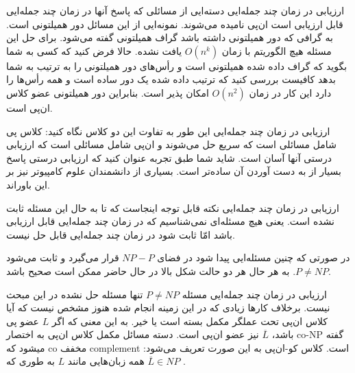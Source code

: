 \begin{itemframe}{ارزیابی در زمان چند جمله‌ایی}
\itm
دسته‌ایی از مسائلی که پاسخ آنها در زمان چند جمله‌ایی قابل ارزیابی است ان‌پی نامیده می‌شوند. نمونه‌ایی از این مسائل دور همیلتونی است. به گرافی که دور همیلتونی داشته باشد گراف همیلتونی
 گفته می‌شود.
\itm
برای حل این مسئله هیچ الگوریتم با زمان
$O(n^k)$
یافت نشده.
\itm
حالا فرض کنید که کسی به شما بگوید که گراف داده شده همیلتونی است و رأس‌های دور همیلتونی را به ترتیب به شما بدهد کافیست بررسی کنید که ترتیب داده شده یک دور ساده است و همه رأس‌ها را دارد این کار در زمان
$O(n^2)$
امکان پذیر است. بنابراین دور همیلتونی عضو کلاس ان‌پی است.
\end{itemframe}
\begin{itemframe}{ارزیابی در زمان چند جمله‌ایی}
\itm
این طور به تفاوت این دو کلاس نگاه کنید:‌ کلاس پی شامل مسائلی است که سریع حل می‌شوند و ان‌پی شامل مسائلی است که ارزیابی درستی آنها آسان است.
\itm
شاید شما طبق تجربه عنوان کنید که ارزیابی درستی پاسخ بسیار از به دست آوردن آن ساده‌تر است. بسیاری از دانشمندان علوم کامپیوتر نیز بر این باوراند.
\end{itemframe}
\begin{itemframe}{ارزیابی در زمان چند جمله‌ایی}
\itm
نکته قابل توجه اینجاست که تا به حال این مسئله ثابت نشده است. یعنی هیچ مسئله‌ای نمی‌شناسیم که در زمان چند جمله‌ایی قابل ارزیابی باشد امّا ثابت شود در زمان چند جمله‌ایی قابل حل نیست.

\itm
در صورتی که چنین مسئله‌ایی پیدا شود در فضای
$NP - P$
قرار می‌گیرد و ثابت می‌شود
$P \neq NP$.
به هر حال هر دو حالت شکل بالا در حال حاضر ممکن است صحیح باشد.
\end{itemframe}
\begin{itemframe}{ارزیابی در زمان چند جمله‌ایی}
\itm
مسئله
$P \neq NP$
تنها مسئله حل نشده در این مبحث نیست. برخلاف کار‌ها زیادی که در این زمینه انجام شده هنوز مشخص نیست که آیا کلاس ان‌پی تحت عملگر مکمل بسته است یا خیر. به این معنی که اگر
$L$
عضو پی باشد،
$\overline{L}$
نیز عضو ان‌پی است.
\itm
دسته مسائل مکمل کلاس ان‌پی به اختصار co-NP گفته میشود که co مخفف complement است.
\itm
کلاس کو-ان‌پی به این صورت تعریف می‌شود: همه زبان‌هایی مانند $L$ به طوری که
$\overline{L} \in NP$ .
\end{itemframe}


